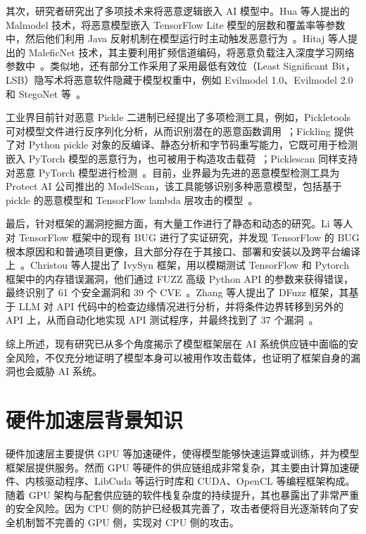 其次，研究者研究出了多项技术来将恶意逻辑嵌入 AI 模型中。Hua 等人提出的 Malmodel 技术，将恶意模型嵌入 TensorFlow Lite 模型的层数和覆盖率等参数中，然后他们利用 Java 反射机制在模型运行时主动触发恶意行为~\cite{hua2024malmodel}。Hitaj 等人提出的 MaleficNet 技术，其主要利用扩频信道编码，将恶意负载注入深度学习网络参数中~\cite{hitaj2024trust}。类似地，还有部分工作采用了采用最低有效位（Least Significant Bit，LSB）隐写术将恶意软件隐藏于模型权重中，例如 Evilmodel 1.0、Evilmodel 2.0 和 StegoNet 等~\cite{wang2021evilmodel, wang2022evilmodel, 10.1145/3427228.3427268}。

工业界目前针对恶意 Pickle 二进制已经提出了多项检测工具，例如，Pickletools 可对模型文件进行反序列化分析，从而识别潜在的恶意函数调用~\cite{python3123pickletools}；Fickling 提供了对 Python pickle 对象的反编译、静态分析和字节码重写能力，它既可用于检测嵌入 PyTorch 模型的恶意行为，也可被用于构造攻击载荷~\cite{fickling_defcon_2021}；Picklescan 同样支持对恶意 PyTorch 模型进行检测~\cite{picklescan}。目前，业界最为先进的恶意模型检测工具为 Protect AI 公司推出的 ModelScan，该工具能够识别多种恶意模型，包括基于 pickle 的恶意模型和 TensorFlow lambda 层攻击的模型~\cite{modelscan_github_2024}。

最后，针对框架的漏洞挖掘方面，有大量工作进行了静态和动态的研究。Li 等人对 TensorFlow 框架中的现有 BUG 进行了实证研究，并发现 TensorFlow 的 BUG 根本原因和和普通项目更像，且大部分存在于其接口、部署和安装以及跨平台编译上~\cite{li2023empirical}。Christou 等人提出了 IvySyn 框架，用以模糊测试 TensorFlow 和 Pytorch 框架中的内存错误漏洞，他们通过 FUZZ 高级 Python API 的参数来获得错误，最终识别了 61 个安全漏洞和 39 个 CVE~\cite{Christou2023ivysyn}。Zhang 等人提出了 DFuzz 框架，其基于 LLM 对 API 代码中的检查边缘情况进行分析，并将条件边界转移到另外的 API 上，从而自动化地实现 API 测试程序，并最终找到了 37 个漏洞~\cite{Zhang2025fix}。


综上所述，现有研究已从多个角度揭示了模型框架层在 AI 系统供应链中面临的安全风险，不仅充分地证明了模型本身可以被用作攻击载体，也证明了框架自身的漏洞也会威胁 AI 系统。

\section{硬件加速层背景知识}
硬件加速层主要提供 GPU 等加速硬件，使得模型能够快速运算或训练，并为模型框架层提供服务。然而 GPU 等硬件的供应链组成非常复杂，其主要由计算加速硬件、内核驱动程序、LibCuda 等运行时库和 CUDA、OpenCL 等编程框架构成。随着 GPU 架构与配套供应链的软件栈复杂度的持续提升，其也暴露出了非常严重的安全风险。因为 CPU 侧的防护已经极其完善了，攻击者便将目光逐渐转向了安全机制暂不完善的 GPU 侧，实现对 CPU 侧的攻击。

